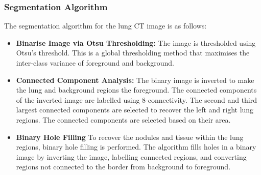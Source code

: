 \documentclass[11pt]{article}
\begin{document}
\subsubsection{Segmentation Algorithm}
The segmentation algorithm for the lung CT image is as follows:
\begin{itemize}
    \item \textbf{Binarise Image via Otsu Thresholding:} The image is thresholded using Otsu's threshold. This is a global thresholding method that maximises the inter-class variance of foreground and background. 
    \item \textbf{Connected Component Analysis:} The binary image is inverted to make the lung and background regions the foreground. The connected components of the inverted image are labelled using 8-connectivity. The second and third largest connected components are selected to recover the left and right lung regions. The connected components are selected based on their area. 
    \item \textbf{Binary Hole Filling} To recover the nodules and tissue within the lung regions, binary hole filling is performed. The algorithm fills holes in a binary image by inverting the image, labelling connected regions, and converting regions not connected to the border from background to foreground.
    \end{itemize}
\end{document}
